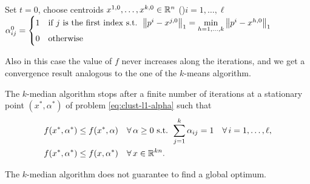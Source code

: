 \begin{algorithm}[H]
\caption{$k$-median algorithm}
Set $t = 0$, choose centroids $x^{1,0},\dots,x^{k,0} \in \mathbb{R}^n$\;
\For(){$i=1,\dots,\ell$}{
    $\alpha_{ij}^0 = \begin{cases} 1 & \text{if } j \text{ is the first index s.t. } \left\lVert p^i - x^{j,0} \right\rVert_1 = \min\limits_{h=1,\dots,k} \left\lVert p^i - x^{h,0} \right\rVert_1\\ 0 & \text{otherwise}\end{cases}$\;
}
\end{algorithm}

Also in this case the value of $f$ never increases along the iterations, and we get a convergence result analogous to the one of the $k$-means algorithm.

\begin{theorem}
The $k$-median algorithm stops after a finite number of iterations at a stationary point $(x^*,\alpha^*)$ of problem \eqref{eq:clust-l1-alpha} such that
\begin{align*}
f(x^*,\alpha^*) &\le f(x^*,\alpha) && \forall\, \alpha \ge 0 \text{ s.t. } \sum_{j=1}^{k} \alpha_{ij} = 1 \quad \forall\, i=1,\dots,\ell,\\
f(x^*,\alpha^*) &\le f(x,\alpha^*) && \forall\, x \in \mathbb{R}^{kn}.
\end{align*}
\end{theorem}

\begin{remark}
The $k$-median algorithm does not guarantee to find a global optimum.
\end{remark}
